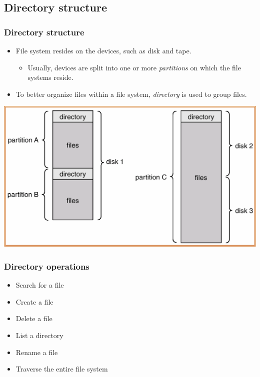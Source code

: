 \documentclass[CJKutf8,xcolor=pdftex,dvipsnames,table]{beamer}
\begin{document}
\begin{CJK*}{UTF8}{song}
  \subsection{Directory structure}

  \begin{frame}
    \frametitle{Directory structure} \pause
    \begin{itemize}
    \item File system resides on the devices, such as disk and tape. \pause
      \begin{itemize}
      \item Usually, devices are split into one or more \emph{partitions} on which the file systems reside. \pause
      \end{itemize}
    \item To better organize files within a file system, \emph{directory} is used to group files. \pause
    \end{itemize}
    \begin{center}
      \includegraphics[scale=.4]{v6f11-5}
    \end{center}
  \end{frame}

  \begin{frame}
    \frametitle{Directory operations} \pause
    \begin{itemize}
    \item Search for a file \pause
    \item Create a file \pause
    \item Delete a file \pause
    \item List a directory \pause
    \item Rename a file \pause
    \item Traverse the entire file system
    \end{itemize}
  \end{frame}


\end{CJK*}
\end{document}
